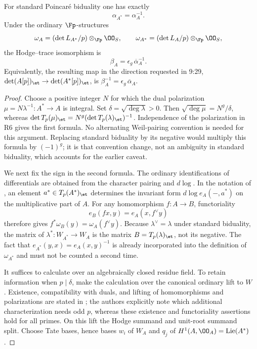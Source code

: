 \begin{theorem}\label{thm:DE-ordinary-sign}
For standard Poincar\'e biduality one has exactly
\[
                         \alpha_{A^*}=\alpha_A^{-1}.
\]
Under the ordinary $\Fp$-structures
\[
 \omega_A=(\det L_{A^*}/p)\otimes_{\Fp}\OO_S,
 \qquad
 \omega_{A^*}=(\det L_A/p)\otimes_{\Fp}\OO_S,
\]
the Hodge--trace isomorphism is
\[
                    \beta_A=\epsilon_g\,\overline\alpha_A^{-1}.
\]
Equivalently, the resulting map in the direction requested in 9:29,
$\det(A[p])_{\et}\to\det(A^*[p])_{\et}$, is
$\beta_A^{-1}=\epsilon_g\,\overline\alpha_A$.
\end{theorem}
\begin{proof}
Choose a positive integer $N$ for which the dual polarization
$\mu=N\lambda^{-1}:A^*\to A$ is integral.  Set
$\delta=\sqrt{\deg\lambda}>0$.  Then
$\sqrt{\deg\mu}=N^g/\delta$, whereas
$\det T_p(\mu)_{\et}=N^g(\det T_p(\lambda)_{\et})^{-1}$.
Independence of the polarization in R6 gives the first formula.  No alternating Weil-pairing convention is needed for this argument.  Replacing standard biduality by its negative would multiply this formula by $(-1)^g$; it is that convention change, not an ambiguity in standard biduality, which accounts for the earlier caveat.

We next fix the sign in the second formula.  The ordinary identifications of differentials are obtained from the character pairing and $d\log$.  In the notation of \cite[\S3.3, pp.~161--162]{Katz1981ST}, an element $a^*\in T_p(A^*)_{\et}$ determines the invariant form
$d\log e_A(-,a^*)$ on the multiplicative part of $A$.  For any homomorphism $f:A\to B$, functoriality
\[
                 e_B(fx,y)=e_A(x,f^\vee y)
\]
therefore gives $f^*\omega_B(y)=\omega_A(f^\vee y)$.  Because $\lambda^\vee=\lambda$ under standard biduality, the matrix of $\lambda^*:W_{A^*}\to W_A$ is the matrix
$B=T_p(\lambda)_{\et}$, not its negative.  The fact that
$e_{A^*}(y,x)=e_A(x,y)^{-1}$ is already incorporated into the definition of $\omega_{A^*}$ and must not be counted a second time.

It suffices to calculate over an algebraically closed residue field.  To retain information when $p\mid\delta$, make the calculation over the canonical ordinary lift to $W$.  Existence, compatibility with duals, and lifting of homomorphisms and polarizations are stated in \cite[Theorem~1.4 and the paragraph following it]{DworkOgus1986}; the authors explicitly note which additional characterization needs odd $p$, whereas these existence and functoriality assertions hold for all primes.  On this lift the Hodge summand and unit-root summand split.  Choose Tate bases, hence bases $w_i$ of $W_A$ and $q_j$ of $H^1(A,\OO_A)=\operatorname{Lie}(A^*)$.


\end{proof}
